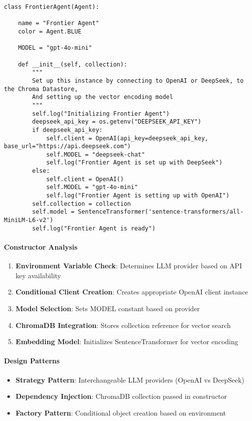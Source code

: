 \begin{lstlisting}[caption=FrontierAgent Class Structure]
class FrontierAgent(Agent):

    name = "Frontier Agent"
    color = Agent.BLUE

    MODEL = "gpt-4o-mini"
    
    def __init__(self, collection):
        """
        Set up this instance by connecting to OpenAI or DeepSeek, to the Chroma Datastore,
        And setting up the vector encoding model
        """
        self.log("Initializing Frontier Agent")
        deepseek_api_key = os.getenv("DEEPSEEK_API_KEY")
        if deepseek_api_key:
            self.client = OpenAI(api_key=deepseek_api_key, base_url="https://api.deepseek.com")
            self.MODEL = "deepseek-chat"
            self.log("Frontier Agent is set up with DeepSeek")
        else:
            self.client = OpenAI()
            self.MODEL = "gpt-4o-mini"
            self.log("Frontier Agent is setting up with OpenAI")
        self.collection = collection
        self.model = SentenceTransformer('sentence-transformers/all-MiniLM-L6-v2')
        self.log("Frontier Agent is ready")
\end{lstlisting}

\paragraph{Constructor Analysis}
\begin{enumerate}
\item \textbf{Environment Variable Check}: Determines LLM provider based on API key availability
\item \textbf{Conditional Client Creation}: Creates appropriate OpenAI client instance
\item \textbf{Model Selection}: Sets MODEL constant based on provider
\item \textbf{ChromaDB Integration}: Stores collection reference for vector search
\item \textbf{Embedding Model}: Initializes SentenceTransformer for vector encoding
\end{enumerate}

\paragraph{Design Patterns}
\begin{itemize}
\item \textbf{Strategy Pattern}: Interchangeable LLM providers (OpenAI vs DeepSeek)
\item \textbf{Dependency Injection}: ChromaDB collection passed in constructor
\item \textbf{Factory Pattern}: Conditional object creation based on environment
\end{itemize}

